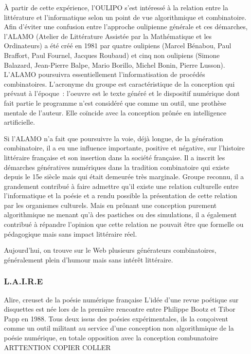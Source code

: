 \documentclass{article}
\begin{document}
				À partir de cette expérience, l'OULIPO s'est intéressé à la relation entre la littérature et l'informatique selon un point de vue algorithmique et combinatoire. Afin d'éviter une confusion entre l'approche oulipienne générale et ces démarches, l'ALAMO (Atelier de Littérature Assistée par la Mathématique et les Ordinateurs) a été créé en 1981 par quatre oulipiens (Marcel Bénabou, Paul Braffort, Paul Fournel, Jacques Roubaud) et cinq non oulipiens (Simone Balazard, Jean-Pierre Balpe, Mario Borillo, Michel Bonin, Pierre Lusson). L'ALAMO poursuivra essentiellement l'informatisation de procédés combinatoires. L'acronyme du groupe est caractéristique de la conception qui prévaut à l'époque~: l'oeuvre est le texte généré et le dispositif numérique dont fait partie le programme n'est considéré que comme un outil, une prothèse mentale de l'auteur. Elle coïncide avec la conception prônée en intelligence artificielle.
				
				Si l'ALAMO n'a fait que poursuivre la voie, déjà longue, de la génération combinatoire, il a eu une influence importante, positive et négative, sur l'histoire littéraire française et son insertion dans la société française. Il a inscrit les démarches génératives numériques dans la tradition combinatoire qui existe depuis le 15e siècle mais qui était demeurée très marginale. Groupe reconnu, il a grandement contribué à faire admettre qu'il existe une relation culturelle entre l'informatique et la poésie et a rendu possible la présentation de cette relation par les organismes culturels. Mais en prônant une conception purement algorithmique ne menant qu'à des pastiches ou des simulations, il a également contribué à répandre l'opinion que cette relation ne pouvait être que formelle ou pédagogique mais sans impact littéraire réel.
				
				Aujourd'hui, on trouve sur le Web plusieurs générateurs combinatoires, généralement plein d'humour mais sans intérêt littéraire.
			\subsubsection{L.A.I.R.E}
				Alire, creuset de la poésie numérique française
				L'idée d'une revue poétique sur disquettes est née lors de la première rencontre entre Philippe Bootz et Tibor Papp en 1988. Tous deux issus des poésies expérimentales, ils la conçoivent comme un outil militant au service d'une conception non algorithmique de la poésie numérique, en totale opposition avec la conception combunatoire ARTTENTION COPIER COLLER
				
\end{document}
